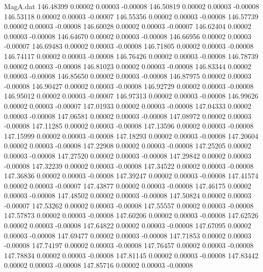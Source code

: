 \begin{filecontents}{MagA.dat}
 146.48399    0.00002    0.00003   -0.00008
 146.50819    0.00002    0.00003   -0.00008
 146.53118    0.00002    0.00003   -0.00007
 146.55356    0.00002    0.00003   -0.00008
 146.57739    0.00002    0.00003   -0.00008
 146.60028    0.00002    0.00003   -0.00007
 146.62404    0.00002    0.00003   -0.00008
 146.64670    0.00002    0.00003   -0.00008
 146.66956    0.00002    0.00003   -0.00007
 146.69483    0.00002    0.00003   -0.00008
 146.71805    0.00002    0.00003   -0.00008
 146.74117    0.00002    0.00003   -0.00008
 146.76426    0.00002    0.00003   -0.00008
 146.78739    0.00002    0.00003   -0.00008
 146.81023    0.00002    0.00003   -0.00008
 146.83344    0.00002    0.00003   -0.00008
 146.85650    0.00002    0.00003   -0.00008
 146.87975    0.00002    0.00003   -0.00008
 146.90427    0.00002    0.00003   -0.00008
 146.92729    0.00002    0.00003   -0.00008
 146.95012    0.00002    0.00003   -0.00007
 146.97313    0.00002    0.00003   -0.00008
 146.99626    0.00002    0.00003   -0.00007
 147.01933    0.00002    0.00003   -0.00008
 147.04333    0.00002    0.00003   -0.00008
 147.06581    0.00002    0.00003   -0.00008
 147.08972    0.00002    0.00003   -0.00008
 147.11285    0.00002    0.00003   -0.00008
 147.13596    0.00002    0.00003   -0.00008
 147.15999    0.00002    0.00003   -0.00008
 147.18293    0.00002    0.00003   -0.00008
 147.20604    0.00002    0.00003   -0.00008
 147.22908    0.00002    0.00003   -0.00008
 147.25205    0.00002    0.00003   -0.00008
 147.27520    0.00002    0.00003   -0.00008
 147.29842    0.00002    0.00003   -0.00008
 147.32239    0.00002    0.00003   -0.00008
 147.34522    0.00002    0.00003   -0.00008
 147.36836    0.00002    0.00003   -0.00008
 147.39247    0.00002    0.00003   -0.00008
 147.41574    0.00002    0.00003   -0.00007
 147.43877    0.00002    0.00003   -0.00008
 147.46175    0.00002    0.00003   -0.00008
 147.48502    0.00002    0.00003   -0.00008
 147.50824    0.00002    0.00003   -0.00007
 147.53262    0.00002    0.00003   -0.00008
 147.55557    0.00002    0.00003   -0.00008
 147.57873    0.00002    0.00003   -0.00008
 147.60206    0.00002    0.00003   -0.00008
 147.62526    0.00002    0.00003   -0.00008
 147.64822    0.00002    0.00003   -0.00008
 147.67095    0.00002    0.00003   -0.00008
 147.69477    0.00002    0.00003   -0.00008
 147.71853    0.00002    0.00003   -0.00008
 147.74197    0.00002    0.00003   -0.00008
 147.76457    0.00002    0.00003   -0.00008
 147.78834    0.00002    0.00003   -0.00008
 147.81145    0.00002    0.00003   -0.00008
 147.83442    0.00002    0.00003   -0.00008
 147.85716    0.00002    0.00003   -0.00008

\end{filecontents}
